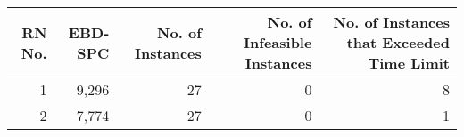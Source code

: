 \begin{tabular}{rrrrr}
\toprule
RN No. & EBD-SPC & No. of Instances & No. of Infeasible Instances & No. of Instances that Exceeded Time Limit \\
\midrule
1 & 9,296 & 27 & 0 & 8 \\
2 & 7,774 & 27 & 0 & 1 \\
\bottomrule
\end{tabular}
